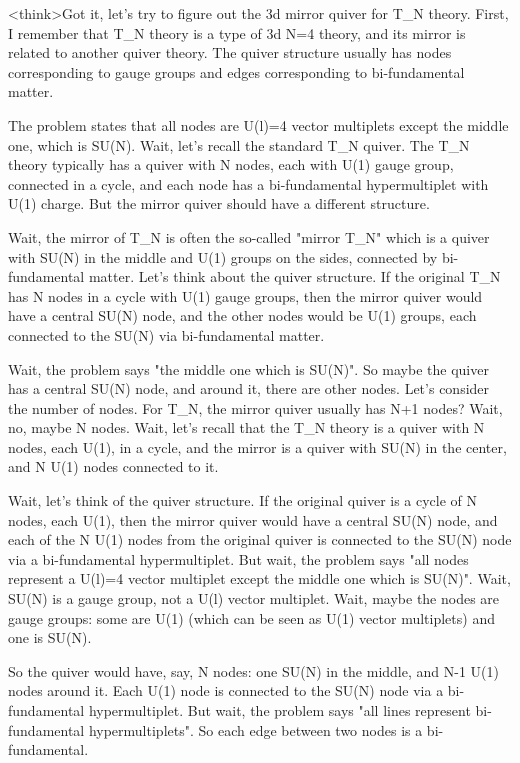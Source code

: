 <think>Got it, let's try to figure out the 3d mirror quiver for T_N theory. First, I remember that T_N theory is a type of 3d N=4 theory, and its mirror is related to another quiver theory. The quiver structure usually has nodes corresponding to gauge groups and edges corresponding to bi-fundamental matter. 

The problem states that all nodes are U(l)=4 vector multiplets except the middle one, which is SU(N). Wait, let's recall the standard T_N quiver. The T_N theory typically has a quiver with N nodes, each with U(1) gauge group, connected in a cycle, and each node has a bi-fundamental hypermultiplet with U(1) charge. But the mirror quiver should have a different structure. 

Wait, the mirror of T_N is often the so-called "mirror T_N" which is a quiver with SU(N) in the middle and U(1) groups on the sides, connected by bi-fundamental matter. Let's think about the quiver structure. If the original T_N has N nodes in a cycle with U(1) gauge groups, then the mirror quiver would have a central SU(N) node, and the other nodes would be U(1) groups, each connected to the SU(N) via bi-fundamental matter. 

Wait, the problem says "the middle one which is SU(N)". So maybe the quiver has a central SU(N) node, and around it, there are other nodes. Let's consider the number of nodes. For T_N, the mirror quiver usually has N+1 nodes? Wait, no, maybe N nodes. Wait, let's recall that the T_N theory is a quiver with N nodes, each U(1), in a cycle, and the mirror is a quiver with SU(N) in the center, and N U(1) nodes connected to it. 

Wait, let's think of the quiver structure. If the original quiver is a cycle of N nodes, each U(1), then the mirror quiver would have a central SU(N) node, and each of the N U(1) nodes from the original quiver is connected to the SU(N) node via a bi-fundamental hypermultiplet. But wait, the problem says "all nodes represent a U(l)=4 vector multiplet except the middle one which is SU(N)". Wait, SU(N) is a gauge group, not a U(l) vector multiplet. Wait, maybe the nodes are gauge groups: some are U(1) (which can be seen as U(1) vector multiplets) and one is SU(N). 

So the quiver would have, say, N nodes: one SU(N) in the middle, and N-1 U(1) nodes around it. Each U(1) node is connected to the SU(N) node via a bi-fundamental hypermultiplet. But wait, the problem says "all lines represent bi-fundamental hypermultiplets". So each edge between two nodes is a bi-fundamental. 

